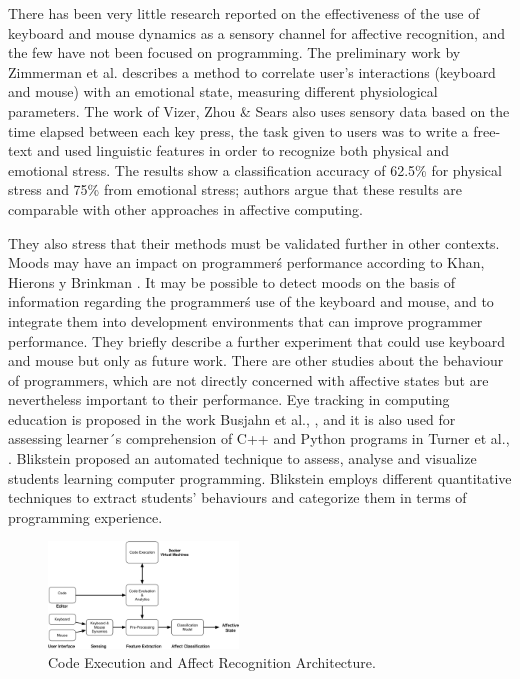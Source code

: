 \documentclass[a4paper,twoside]{article}
\begin{document}
There has been very little research reported on the effectiveness of the use of
keyboard and mouse dynamics as a sensory channel for affective recognition, and
the few have not been focused on programming. The preliminary work by Zimmerman
et al. \cite{zimmermann2003affective} describes a method to correlate user’s interactions (keyboard and
mouse) with an emotional state, measuring different physiological parameters. The work of Vizer, Zhou \& Sears \cite{vizer2009automated} also
uses sensory data based on the time elapsed between each key press, the task
given to users was to write a free-text and used linguistic features in order to
recognize both physical and emotional stress. The results show a classification
accuracy of 62.5\% for physical stress and 75\% from emotional stress; authors
argue that these results are comparable with other approaches in affective
computing.

They also stress that their methods must be validated further in
other contexts. Moods may have an impact on programmer\'s performance according
to Khan, Hierons y Brinkman \cite{khan2007mood}. It may be possible to detect moods
on the basis of information regarding the programmer\'s use of the keyboard and
mouse, and to integrate them into development environments that can improve
programmer performance. They briefly describe a further experiment that could
use keyboard and mouse but only as future work. There are other studies about
the behaviour of programmers, which are not directly concerned with affective
states but are nevertheless important to their performance. Eye tracking in
computing education is proposed in the work Busjahn et al., \cite{busjahn2014eye}, and it is
also used for assessing learner´s comprehension of C++ and Python programs in
Turner et al., \cite{turner2014eye}. Blikstein \cite{blikstein2011using} proposed
an automated technique to
assess, analyse and visualize students learning computer programming. Blikstein
employs different quantitative techniques to extract students’ behaviours and
categorize them in terms of programming experience.

\begin{figure}[h!tbp]
\centering
\includegraphics[width=0.45\textwidth]{KMDAffective.png}
\caption{Code Execution and Affect Recognition Architecture.}
\label{fig_process}
\end{figure}
\end{document}
